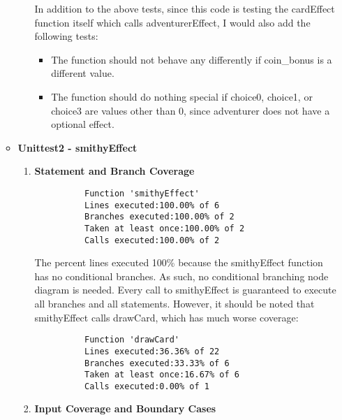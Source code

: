 \documentclass[11pt,letterpaper]{article}
\begin{document}
\begin{enumerate}[label=\Roman*.]
\begin{itemize}[leftmargin=*]
\begin{enumerate}[leftmargin=*]
          In addition to the above tests, since this code is testing the cardEffect 
            function itself which calls adventurerEffect, I would also add the following
            tests:
          \begin{itemize}
            \item The function should not behave any differently if coin\_bonus is 
              a different value. 
            \item The function should do nothing special if choice0, choice1, or choice3 
              are values other than 0, since adventurer does not have a optional effect.
          \end{itemize}
        \end{enumerate}

      \item \textbf{Unittest2 - smithyEffect}
        \begin{enumerate}[leftmargin=*]
          \item \textbf{Statement and Branch Coverage}

          \begin{lstlisting}
          Function 'smithyEffect'
          Lines executed:100.00% of 6
          Branches executed:100.00% of 2
          Taken at least once:100.00% of 2
          Calls executed:100.00% of 2
          \end{lstlisting}

          The percent lines executed 100\% because the smithyEffect function
          has no conditional branches. As such, no conditional branching node
          diagram is needed. Every call to smithyEffect is guaranteed to 
          execute all branches and all statements. However, it should be
          noted that smithyEffect calls drawCard, which has much worse
          coverage: 

          \begin{lstlisting}
          Function 'drawCard'
          Lines executed:36.36% of 22
          Branches executed:33.33% of 6
          Taken at least once:16.67% of 6
          Calls executed:0.00% of 1
          \end{lstlisting}

        \item \textbf{Input Coverage and Boundary Cases}
          

\end{enumerate}
\end{itemize}
\end{enumerate}
\end{document}
